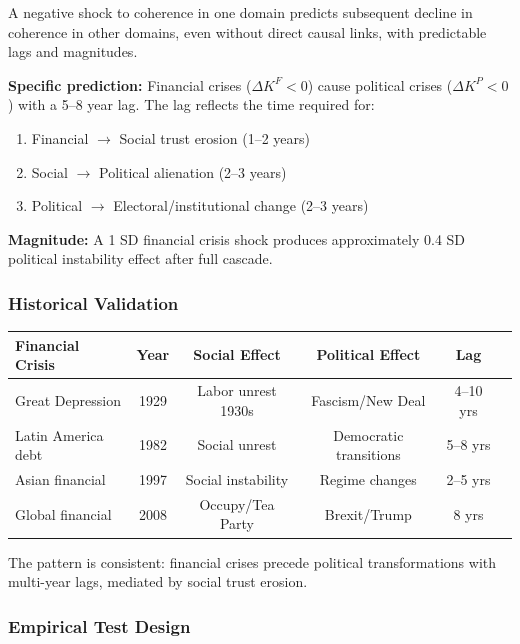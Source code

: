 \begin{tcolorbox}[colback=blue!5!white, colframe=blue!75!black, title=Prediction 2: Cross-Domain Coherence Spillovers]
A negative shock to coherence in one domain predicts subsequent decline 
in coherence in other domains, even without direct causal links, with 
predictable lags and magnitudes.

\textbf{Specific prediction:} Financial crises ($\Delta K^F < 0$) cause political 
crises ($\Delta K^P < 0$) with a 5--8 year lag. The lag reflects the time 
required for:
\begin{enumerate}
  \item Financial $\to$ Social trust erosion (1--2 years)
  \item Social $\to$ Political alienation (2--3 years)
  \item Political $\to$ Electoral/institutional change (2--3 years)
\end{enumerate}

\textbf{Magnitude:} A 1 SD financial crisis shock produces approximately 
0.4 SD political instability effect after full cascade.
\end{tcolorbox}

\subsubsection{Historical Validation}

\begin{center}
\renewcommand{\arraystretch}{1.2}
\begin{tabular}{lccccc}
\hline
\textbf{Financial Crisis} & \textbf{Year} & \textbf{Social Effect} & \textbf{Political Effect} & \textbf{Lag} \\
\hline
Great Depression & 1929 & Labor unrest 1930s & Fascism/New Deal & 4--10 yrs \\
Latin America debt & 1982 & Social unrest & Democratic transitions & 5--8 yrs \\
Asian financial & 1997 & Social instability & Regime changes & 2--5 yrs \\
Global financial & 2008 & Occupy/Tea Party & Brexit/Trump & 8 yrs \\
\hline
\end{tabular}
\end{center}

The pattern is consistent: financial crises precede political transformations 
with multi-year lags, mediated by social trust erosion.

\subsubsection{Empirical Test Design}

